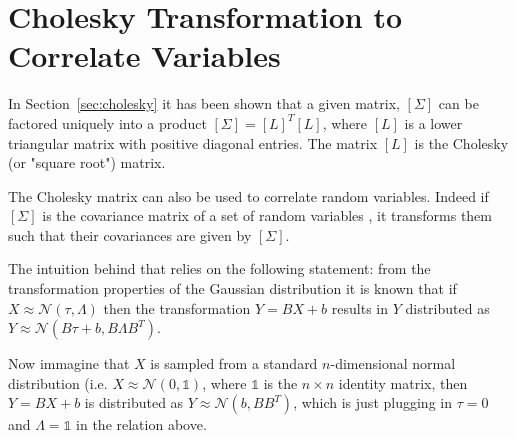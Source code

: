 %
%
%
%

\section{Cholesky Transformation to Correlate Variables}
In Section~\ref{sec:cholesky} it has been shown that a given matrix, $[\Sigma]$ can be factored uniquely into a product $[\Sigma]=[L]^T [L]$, where $[L]$ is a lower triangular matrix with positive diagonal entries. The matrix $[L]$ is the Cholesky (or "square root") matrix.

The Cholesky matrix can also be used to correlate random variables. Indeed if $[\Sigma]$ is the covariance matrix of a set of random variables , it transforms them such that their covariances are given by $[\Sigma]$. 

The intuition behind that relies on the following statement: from the transformation properties of the Gaussian distribution it is known that if $X\approx\mathcal{N}(\tau,\Lambda)$ then the transformation $Y=BX+b$ results in $Y$ distributed as $Y\approx\mathcal{N}(B\tau +b,B\Lambda B^{T})$.

Now immagine that $X$ is sampled from a standard $n$-dimensional normal distribution (i.e. $X\approx\mathcal{N}(0,\mathbb{1})$, where $\mathbb{1}$ is the $n\times n$ identity matrix, then $Y=BX+b$ is distributed as $Y\approx\mathcal{N}(b,BB^{T})$, which is just plugging in $\tau=0$ and $\Lambda=\mathbb{1}$ in the relation above.

